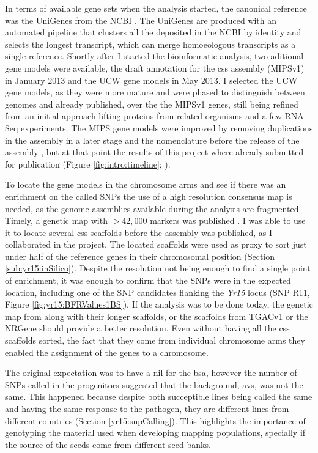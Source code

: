 In terms of available gene sets when the analysis started, the canonical reference was the UniGenes from the NCBI \citep{PontiusJUWagnerL2002}. 
The UniGenes are produced with an automated pipeline that clusters all the  deposited in the NCBI by identity and selects the longest transcript, which can merge homoeologous transcripts as a single reference.
Shortly after I started the bioinformatic analysis, two aditional gene models were available, the draft annotation for the \acrshort{css} assembly (MIPSv1) in January 2013 and the UCW gene models \citep{Krasileva2013} in May 2013. 
I selected the UCW gene models, as they were more mature and were phased to distinguish between genomes and already published, over the the MIPSv1 genes, still being refined from an initial approach lifting proteins from related organisms and a few RNA-Seq experiments.  
The MIPS gene models were improved by removing duplications in the assembly in a later stage and the nomenclature before the release of the assembly \citep{Mayer2014}, but at that point the results of this project where already submitted for publication (Figure \ref{fig:intro:timeline}; \citealt{Ramirez-Gonzalez2015b}). 

To locate the gene models in the chromosome arms and see if there was an enrichment on the called SNPs the use of a high resolution consensus map is needed, as the genome assemblies available during the analysis are fragmented. 
Timely, a genetic map with $>42,000$ markers was published \citep{Wang2014}. 
I was able to use it to locate several \acrshort{css} scaffolds before the assembly was published, as I collaborated in the project. 
The located scaffolds were used as proxy to sort just under half of the reference genes in their chromosomal position (Section \ref{sub:yr15:inSilico}). 
Despite the resolution not being enough to find a single point of enrichment, it was enough to confirm that the SNPs were in the expected location, including one of the SNP candidates flanking the \textit{Yr15} locus (SNP R11, Figure \ref{fig:yr15:BFRValues1BS}).  
If the analysis was to be done today, the genetic map from \citet{Chapman2015} along with their longer scaffolds, or the scaffolds from TGACv1 or the NRGene should provide a better resolution. 
Even without having all the \acrshort{css} scaffolds sorted, the fact that they come from individual chromosome arms they enabled the assignment of the genes to a chromosome. 

The original expectation was to have a \gls{nil} for the \acrshort{bsa}, however the number of SNPs called in the progenitors suggested that the background, \acrlong{avs}, was not the same.  
This happened because despite both succeptible lines being called the same and having the same response to the pathogen, they are different lines from different countries (Section \ref{yr15:snpCalling}). 
This highlights the importance of genotyping the material used when developing mapping populations, specially if the source of the seeds come from different seed banks. 


